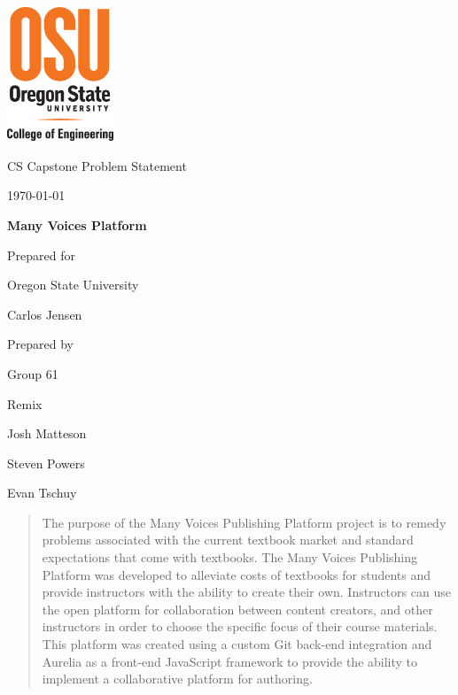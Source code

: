 \documentclass[onecolumn, draftclsnofoot,10pt, compsoc]{IEEEtran}
\def \CapstoneTeamName{		Remix}
\def \CapstoneTeamNumber{		61}
\def \GroupMemberOne{			Josh Matteson}
\def \GroupMemberTwo{			Steven Powers}
\def \GroupMemberThree{			Evan Tschuy}
\def \CapstoneProjectName{		Many Voices Platform}
\def \CapstoneSponsorCompany{	Oregon State University}
\def \CapstoneSponsorPerson{		Carlos Jensen}
\def \DocType{
		        Problem Statement
				}
\newcommand{\NameSigPair}[1]{\par
\makebox[2.75in][r]{#1} \hfil 	\makebox[3.25in]{\makebox[2.25in]{\hrulefill} \hfill		\makebox[.75in]{\hrulefill}}
\par\vspace{-12pt} \textit{\tiny\noindent
\makebox[2.75in]{} \hfil		\makebox[3.25in]{\makebox[2.25in][r]{Signature} \hfill	\makebox[.75in][r]{Date}}}}
\renewcommand{\NameSigPair}[1]{#1}
\begin{document}
\begin{titlepage}
    \begin{singlespace}
    	\includegraphics[height=4cm]{coe_v_spot1}
        \hfill
        \par\vspace{.2in}
        \centering
        \scshape{
            \huge CS Capstone \DocType \par
            {\large\today}\par
            \vspace{.5in}
            \textbf{\Huge\CapstoneProjectName}\par
            \vfill
            {\large Prepared for}\par
            \Huge \CapstoneSponsorCompany\par
            \vspace{5pt}
            {\Large\NameSigPair{\CapstoneSponsorPerson}\par}
            {\large Prepared by }\par
            Group\CapstoneTeamNumber\par
            \CapstoneTeamName\par
            \vspace{5pt}
            {\Large
                \NameSigPair{\GroupMemberOne}\par
                \NameSigPair{\GroupMemberTwo}\par
                \NameSigPair{\GroupMemberThree}\par
            }
            \vspace{20pt}
        }
        \begin{abstract}
		\noindent The purpose of the Many Voices Publishing Platform 
		project is to remedy problems associated with the current textbook market 
		and standard expectations that come with textbooks. 
		The Many Voices Publishing Platform was developed to alleviate 
		costs of textbooks for students and provide instructors with the ability 
		to create their own. Instructors can use the open platform for 
		collaboration between content creators, and other instructors in order 
		to choose the specific focus of their course materials. 
		This platform was created using a custom Git back-end integration and Aurelia 
		as a front-end JavaScript framework to provide the ability to implement a 
		collaborative platform for authoring.
        \end{abstract}
    \end{singlespace}
\end{titlepage}
\end{document}
